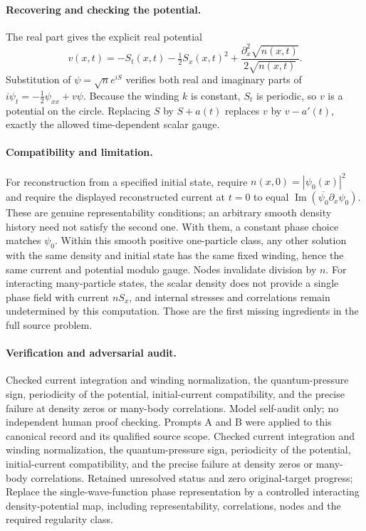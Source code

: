 \documentclass[11pt]{article}
\begin{document}
\paragraph{Recovering and checking the potential.}
The real part gives the explicit real potential
\[
 v(x,t)=-S_t(x,t)-\tfrac12 S_x(x,t)^2
             +\frac{\partial_x^2\sqrt{n(x,t)}}{2\sqrt{n(x,t)}}.
\]
Substitution of $\psi=\sqrt n e^{iS}$ verifies both real and imaginary parts of
$i\psi_t=-\tfrac12\psi_{xx}+v\psi$.
Because the winding $k$ is constant, $S_t$ is periodic, so $v$ is a potential on the circle. Replacing $S$ by $S+a(t)$ replaces $v$ by $v-a'(t)$, exactly the allowed time-dependent scalar gauge.

\paragraph{Compatibility and limitation.}
For reconstruction from a specified initial state, require $n(x,0)=|\psi_0(x)|^2$ and require the displayed reconstructed current at $t=0$ to equal $\operatorname{Im}(\overline{\psi_0}\partial_x\psi_0)$. These are genuine representability conditions; an arbitrary smooth density history need not satisfy the second one. With them, a constant phase choice matches $\psi_0$. Within this smooth positive one-particle class, any other solution with the same density and initial state has the same fixed winding, hence the same current and potential modulo gauge. Nodes invalidate division by $n$. For interacting many-particle states, the scalar density does not provide a single phase field with current $nS_x$, and internal stresses and correlations remain undetermined by this computation. Those are the first missing ingredients in the full source problem.

\paragraph{Verification and adversarial audit.}
Checked current integration and winding normalization, the quantum-pressure sign, periodicity of the potential, initial-current compatibility, and the precise failure at density zeros or many-body correlations. Model self-audit only; no independent human proof checking. Prompts A and B were applied to this canonical record and its qualified source scope. Checked current integration and winding normalization, the quantum-pressure sign, periodicity of the potential, initial-current compatibility, and the precise failure at density zeros or many-body correlations. Retained unresolved status and zero original-target progress; Replace the single-wave-function phase representation by a controlled interacting density-potential map, including representability, correlations, nodes and the required regularity class.
\end{document}
